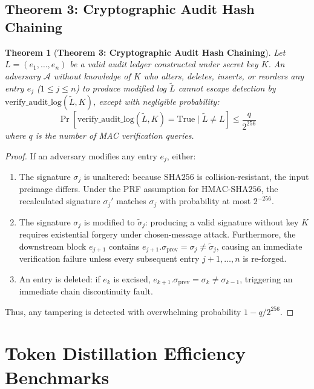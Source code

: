 \documentclass[10pt,conference,letterpaper]{article}
\newtheorem{theorem}{Theorem}
\begin{document}
\subsection{Theorem 3: Cryptographic Audit Hash Chaining}

\begin{theorem}[\textbf{Theorem 3: Cryptographic Audit Hash Chaining}]
Let $L = (e_1, \dots, e_n)$ be a valid audit ledger constructed under secret key $K$. An adversary $\mathcal{A}$ without knowledge of $K$ who alters, deletes, inserts, or reorders any entry $e_j$ ($1 \le j \le n$) to produce modified log $\tilde{L}$ cannot escape detection by $\text{verify\_audit\_log}(\tilde{L}, K)$, except with negligible probability:
\begin{equation}
\Pr[\text{verify\_audit\_log}(\tilde{L}, K) = \text{True} \mid \tilde{L} \neq L] \le \frac{q}{2^{256}}
\end{equation}
where $q$ is the number of MAC verification queries.
\end{theorem}

\begin{proof}
If an adversary modifies any entry $e_j$, either:
\begin{enumerate}
    \item The signature $\sigma_j$ is unaltered: because $\text{SHA256}$ is collision-resistant, the input preimage differs. Under the PRF assumption for $\text{HMAC-SHA256}$, the recalculated signature $\sigma_j'$ matches $\sigma_j$ with probability at most $2^{-256}$.
    \item The signature $\sigma_j$ is modified to $\tilde{\sigma}_j$: producing a valid signature without key $K$ requires existential forgery under chosen-message attack. Furthermore, the downstream block $e_{j+1}$ contains $e_{j+1}.\sigma_{\text{prev}} = \sigma_j \neq \tilde{\sigma}_j$, causing an immediate verification failure unless every subsequent entry $j+1, \dots, n$ is re-forged.
    \item An entry is deleted: if $e_k$ is excised, $e_{k+1}.\sigma_{\text{prev}} = \sigma_k \neq \sigma_{k-1}$, triggering an immediate chain discontinuity fault.
\end{enumerate}
Thus, any tampering is detected with overwhelming probability $1 - q / 2^{256}$.
\end{proof}

\section{Token Distillation Efficiency Benchmarks}
\end{document}
